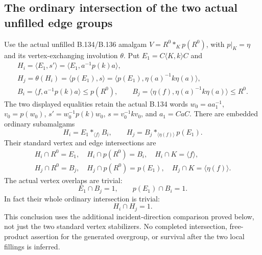 \subsection*{The ordinary intersection of the two actual unfilled edge groups}

\label{stmt:B137}
Use the actual unfilled B.134/B.136 amalgam
$V=R^0*_{K}p(R^0)$, with $p|_K=\eta$ and its vertex-exchanging
involution $\theta$. Put $E_1=C\langle K,k\rangle C$ and
\begin{equation}\label{eq:B137-edge-groups}
 \begin{gathered}
 H_i=\langle E_1,s'\rangle
       =\langle E_1,a^{-1}p(k)a\rangle,\\
 H_j=\theta(H_i)=\langle p(E_1),s\rangle
       =\langle p(E_1),\eta(a)^{-1}k\eta(a)\rangle,\\
 B_i=\langle f,a^{-1}p(k)a\rangle\leq p(R^0),\qquad
 B_j=\langle\eta(f),\eta(a)^{-1}k\eta(a)\rangle\leq R^0.
 \end{gathered}
\end{equation}
The two displayed equalities retain the actual B.134 words
$w_0=aa_1^{-1}$, $v_0=p(w_0)$, $s'=w_0^{-1}p(k)w_0$,
$s=v_0^{-1}kv_0$, and $a_1=CaC$.
There are embedded ordinary subamalgams
\begin{equation}\label{eq:B137-subamalgams}
 H_i=E_1*_{\langle f\rangle}B_i,\qquad
 H_j=B_j*_{\langle\eta(f)\rangle}p(E_1).
\end{equation}
Their standard vertex and edge intersections are
\begin{equation}\label{eq:B137-standard-intersections}
 \begin{gathered}
 H_i\cap R^0=E_1,\quad H_i\cap p(R^0)=B_i,\quad
 H_i\cap K=\langle f\rangle,\\
 H_j\cap R^0=B_j,\quad H_j\cap p(R^0)=p(E_1),\quad
 H_j\cap K=\langle\eta(f)\rangle.
 \end{gathered}
\end{equation}
The actual vertex overlaps are trivial:
\begin{equation}\label{eq:B137-overlaps}
 E_1\cap B_j=1,\qquad p(E_1)\cap B_i=1.
\end{equation}
In fact their whole ordinary intersection is trivial:
\begin{equation}\label{eq:B137-whole-intersection}
 H_i\cap H_j=1.
\end{equation}
This conclusion uses the additional incident-direction comparison
proved below, not just the two standard vertex stabilizers.
No completed intersection, free-product assertion for the generated
overgroup, or survival after the two local fillings is inferred.

